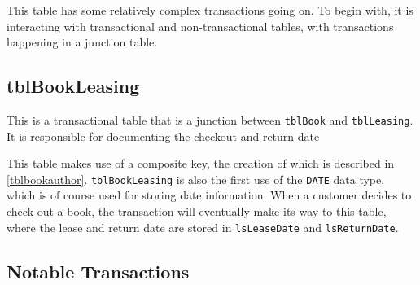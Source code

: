 \documentclass[11pt,a4paper]{scrartcl}
\begin{document}
	This table has some relatively complex transactions going on. To begin with, it is interacting with transactional and non-transactional tables, with transactions happening in a junction table.
	
	\subsection{tblBookLeasing}\label{tblbookleasing}
	
	This is a transactional table that is a junction between \texttt{tblBook} and \texttt{tblLeasing}. It is responsible for documenting the checkout and return date 
	
	
	
	This table makes use of a composite key, the creation of which is described in \ref{tblbookauthor}. \texttt{tblBookLeasing} is also the first use of the \texttt{DATE} data type, which is of course used for storing date information. When a customer decides to check out a book, the transaction will eventually make its way to this table, where the lease and return date are stored in \texttt{lsLeaseDate} and \texttt{lsReturnDate}.
	
	\subsection{Notable Transactions}
	
	
\end{document}
